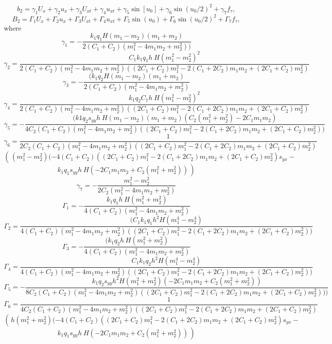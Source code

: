 \[
b_2=\gamma_1 U_x+ \gamma_2 u_x+ \gamma_3 U_{xt}+\gamma_4 u_{xt}+\gamma_5 \sin[u_0] +\gamma_6 \sin(u_0/2)^2+ \gamma_7 f_\tau,
\]
\[
B_2=\Gamma_1 U_x+ \Gamma_2 u_x+ \Gamma_{3} U_{xt}+\Gamma_{4} u_{xt}+\Gamma_{5} \sin(u_0) +\Gamma_{6} \sin(u_0/2)^2+ \Gamma_{7} f_\tau,
\]
where
\[
\gamma_1=-\frac{ k_1 q_1 H (m_1 - m_2) (m_1 + m_2) }{2 (C_1 + C_2) (m_1^2 - 4 m_1 m_2 + m_2^2))}
\]
\[
\gamma_2=\frac{C_1  k_1 q_1  h ~H(m_1^2 - m_2^2)^2}{2 (C_1 + C_2) (m_1^2 - 4 m_1 m_2 + 
	m_2^2) ((2 C_1 + C_2) m_1^2 - 2 (C_1 + 2 C_2) m_1 m_2 + (2 C_1 + C_2) m_2^2)}
\]
\[
\gamma_3=   -\frac{(k_1  q_2 H(m_1 - m_2) (m_1 + m_2)}{2 (C_1 + C_2) (m_1^2 - 4 m_1 m_2 + m_2^2)}
\]
\[
\gamma_4=\frac{ k_1 q_2 C_1 h ~H(m_1^2 - m_2^2)^2 }{2 (C_1 + C_2) (m_1^2 - 4 m_1 m_2 + 
	m_2^2) ((2 C_1 + C_2) m_1^2 - 2 (C_1 + 2 C_2) m_1 m_2 + (2 C_1 + C_2) m_2^2)}
\]
\[
\gamma_5=-\frac{( k1  q_2 s_{yy} h ~H (m_1 - m_2) (m_1 + m_2) ( C_2 (m_1^2 + m_2^2)-2 C_1 m_1 m_2  
	)}{ 4 C_2 (C_1 + C_2) (m_1^2 - 4 m_1 m_2 + m_2^2) ((2 C_1 + C_2) m_1^2 - 2 (C_1 + 2 C_2) m_1 m_2 + (2 C_1 + C_2) m_2^2))}
\]
\[
\gamma_6=\frac{1} {2 C_2 (C_1 + 
	C_2) (m_1^2 - 4 m_1 m_2 + m_2^2) ((2 C_1 + C_2) m_1^2 - 
	2 (C_1 + 2 C_2) m_1 m_2 + (2 C_1 + C_2) m_2^2)}
\]
\[
\left(\frac{}{} (m_1^2 - m_2^2)  (-4 (C_1 + C_2) ((2 C_1 + C_2) m_1^2 - 
2 (C_1 + 2 C_2) m_1 m_2 + (2 C_1 + C_2) m_2^2) s_{yx} - \right.
\]
\[
\left.
k_1q_1 s_{yy} h~ H (-2 C_1 m_1 m_2 + C_2 (m_1^2 + m_2^2))\frac{}{} \right)
\]
\[
\gamma_7=-\frac{m_1^2 - m_2^2}{2 C_2 (m_1^2 - 4 m_1 m_2 + m_2^2)}
\]
\[
\Gamma_1=-\frac{ k_1 q_1 h~ H (m_1^2 + m_2^2) }{4 (C_1 + C_2) (m_1^2 - 4 m_1 m_2 + m_2^2)}
\]
\[
\Gamma_2=\frac{(C_1  k_1 q_1 h^2 H (m_1^4 - m_2^4) }{
	4 (C_1 + C_2) (m_1^2 - 4 m_1 m_2 + m_2^2) ((2 C_1 + C_2) m_1^2 - 
	2 (C_1 + 2 C_2) m_1 m_2 + (2 C_1 + C_2) m_2^2))}
\]
\[
\Gamma_{3}=-\frac{(k_1 q_2 h ~H (m_1^2 + m_2^2) }{4 (C_1 + C_2) (m_1^2 - 4 m_1 m_2 + m_2^2)}
\]
\[
\Gamma_{4}=\frac{C_1  k_1 q_2 h^2 H (m_1^4 - m_2^4) }{
	4 (C_1 + C_2) (m_1^2 - 4 m_1 m_2 + m_2^2) ((2 C_1 + C_2) m_1^2 - 
	2 (C_1 + 2 C_2) m_1 m_2 + (2 C_1 + C_2) m_2^2))}
\]
\[
\Gamma_{5}=-\frac{ k_1 q_2 s_{yy} h^2 H (m_1^2 + m_2^2) (-2 C_1 m_1 m_2 + C_2 (m_1^2 + m_2^2)) }{
	8 C_2 (C_1 + C_2) (m_1^2 - 4 m_1 m_2 + m_2^2) ((2 C_1 + C_2) m_1^2 - 
	2 (C_1 + 2 C_2) m_1 m_2 + (2 C_1 + C_2) m_2^2)))}
\]
\[
\Gamma_{6}=\frac{1}{4 C_2 (C_1 + 
	C_2) (m_1^2 - 4 m_1 m_2 + m_2^2) ((2 C_1 + C_2) m_1^2 - 
	2 (C_1 + 2 C_2) m_1 m_2 + (2 C_1 + C_2) m_2^2)}
\]
\[
\left(\frac{}{}  h (m_1^2 + m_2^2) (-4 (C_1 + C_2) ((2 C_1 + C_2) m_1^2 - 
2 (C_1 + 2 C_2) m_1 m_2 + (2 C_1 + C_2) m_2^2) s_{yx} - \right.
\]
\[
\left.    k_1 q_1 s_{yy} h ~H(-2 C_1 m_1 m_2 + C_2 (m_1^2 + m_2^2))\frac{}{} \right)
\]
